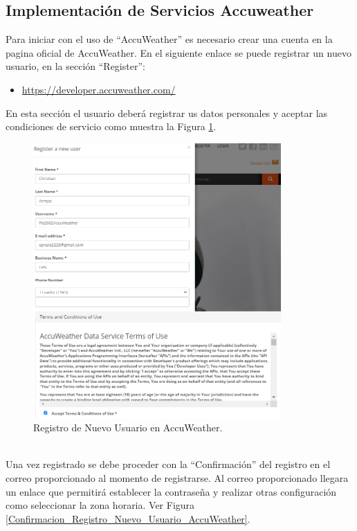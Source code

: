 \documentclass[a4paper,10pt, oneside, titlepage]{article}
\begin{document}
	\subsection{Implementación de Servicios Accuweather}\label{Etiqueta_Servicios_Accuweather}
	Para iniciar con el uso de ``AccuWeather'' es necesario crear una cuenta en la pagina oficial de AccuWeather. En el siguiente enlace se puede registrar un nuevo usuario, en la sección ``Register'':
	\begin{itemize}
		\item \textcolor{blue}{\url{https://developer.accuweather.com/}}
	\end{itemize}
	\indent\newline\indent En esta sección el usuario deberá registrar us datos personales y aceptar las condiciones de servicio como muestra la Figura \ref{Registro_Nuevo_Usuario_AccuWeather}.
	\begin{figure}[!h]
		\centering
		\includegraphics[width = 1\linewidth, height = 10.5cm]{Registro_Nuevo_Usuario_AccuWeather.png}
		\caption{Registro de Nuevo Usuario en AccuWeather.}
		\label{Registro_Nuevo_Usuario_AccuWeather}
	\end{figure} \\
	\indent Una vez registrado se debe proceder con la ``Confirmación'' del registro en el correo proporcionado al momento de registrarse. Al correo proporcionado llegara un enlace que permitirá establecer la contraseña y realizar otras configuración como seleccionar la zona horaria. Ver Figura \ref{Confirmacion_Registro_Nuevo_Usuario_AccuWeather}.
\end{document}
